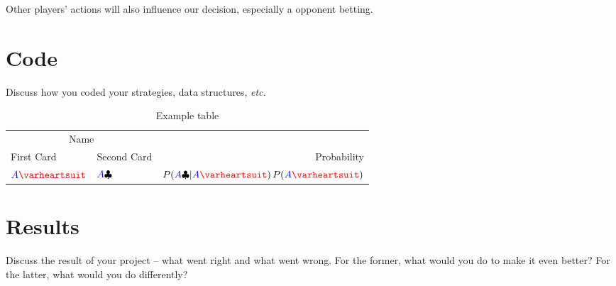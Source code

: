 \documentclass[10pt, a4paper, twocolumn]{article} %
\newcommand*\Hs[1]{\ensuremath{{\color{blue} #1}{\color{red}\varheartsuit}}}
\newcommand*\Cs[1]{\ensuremath{{\color{blue} #1}{\color{black}\clubsuit}}}
\begin{document}
Other players' actions will also influence our decision, especially a opponent betting.  

\section{Code}

Discuss how you coded your strategies, data structures, {\it etc.}
\begin{table}
	\caption{Example table}
	\centering
	\begin{tabular}{llr}
		\toprule
		\multicolumn{2}{c}{Name} \\
		\cmidrule(r){1-2}
		First Card & Second Card  & Probability \\
		\midrule
		\Hs{A} & \Cs{A} & $P(\Cs{A}|\Hs{A})\,P(\Hs{A})$ \\
		\bottomrule
	\end{tabular}
\end{table}


\section{Results}
Discuss the result of your project -- what went right and what went wrong.  For the former, what would you do to make it even better? For the latter, what would you do differently?



\end{document}
